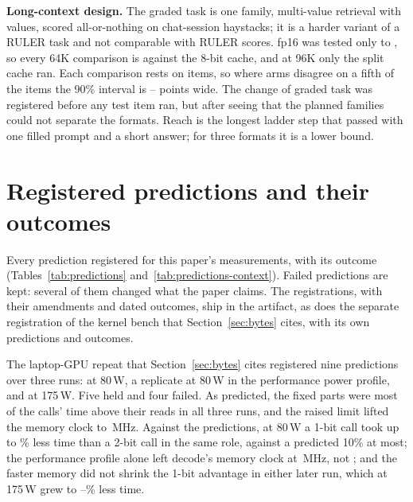 \documentclass[11pt,letterpaper]{article}
\begin{document}
\textbf{Long-context design.} The graded task is one family, multi-value
retrieval with \PeNeedles{} values, scored all-or-nothing on chat-session
haystacks; it is a harder variant of a RULER task and not comparable with
RULER scores. fp16 was tested only to \PeReachFp, so every 64K comparison is against
the 8-bit cache, and at 96K only the split cache ran. Each comparison rests on
\PeHTwoN{} items, so where arms disagree on a fifth of the items the 90\%
interval is \PeWidthMin--\PeWidthMax{} points wide. The change of graded task
was registered before any test item ran, but after seeing that the planned
families could not separate the formats. Reach is the longest ladder step
that passed with one filled prompt and a short answer; for three formats it
is a lower bound.


\section{Registered predictions and their outcomes}
\label{sec:predictions}
Every prediction registered for this paper's measurements, with its outcome
(Tables~\ref{tab:predictions} and~\ref{tab:predictions-context}).
Failed predictions are kept: several of them changed what the paper claims.
The registrations, with their amendments and dated outcomes, ship in the
artifact, as does the separate registration of the kernel bench that
Section~\ref{sec:bytes} cites, with its own predictions and outcomes.

The laptop-GPU repeat that Section~\ref{sec:bytes} cites registered nine
predictions over three runs: at 80\,W, a replicate at 80\,W in the
performance power profile, and at 175\,W. Five held and four failed. As
predicted, the fixed parts were most of the calls' time above their reads in
all three runs, and the raised limit lifted the memory clock to
\PeAdaBoostMemMhz\,MHz. Against the predictions, at 80\,W a 1-bit call took
up to \PeAdaOneFasterHi\% less time than a 2-bit call in the same role,
against a predicted 10\% at most; the performance profile alone left decode's
memory clock at \PeAdaMemMhz\,MHz, not \PeAdaBoostMemMhz; and the faster
memory did not shrink the 1-bit advantage in either later run, which at
175\,W grew to \PeAdaBoostOneFasterLo--\PeAdaBoostOneFasterHi\% less time.
\end{document}
